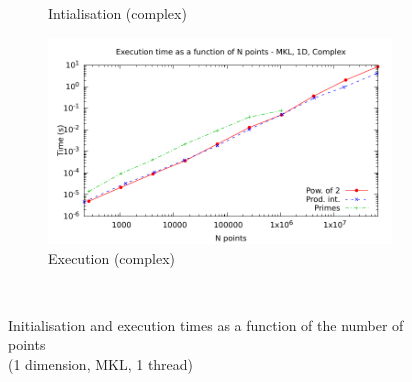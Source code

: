 \documentclass[12pt, a4paper]{article}
\begin{document}
\begin{figure}[H]
\begin{subfigure}{.5\textwidth}
\caption{Intialisation (complex)}
\label{1DMKLCI}
\end{subfigure}%
\begin{subfigure}{.5\textwidth}
\centering
\includegraphics[width=.9\linewidth]{graphs/1d-mkl-exec-c.pdf}
\caption{Execution (complex)}
\label{1DMKLC}
\end{subfigure}\\
\caption{Initialisation and execution times as a function of the number of points\\(1 dimension, MKL, 1 thread)}
\label{1DMKL}
\end{figure}
\end{document}
